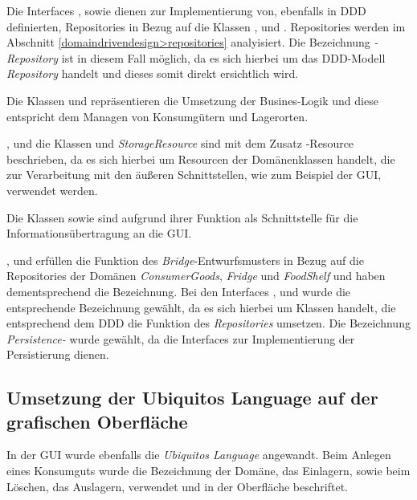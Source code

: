 Die Interfaces \href{}{}, \href{}{} sowie \href{}{} dienen zur Implementierung von, ebenfalls in \ac{DDD} definierten, Repositories in Bezug auf die Klassen \href{}{}, \href{}{} und \href{}{}.
Repositories werden im Abschnitt \ref{domaindrivendesign>repositories} analyisiert.
Die Bezeichnung \textit{-Repository} ist in diesem Fall möglich, da es sich hierbei um das \ac{DDD}-Modell \textit{Repository} handelt und dieses somit direkt ersichtlich wird.

Die Klassen \href{}{} und \href{}{} repräsentieren die Umsetzung der Busines-Logik und diese entspricht dem Managen von Konsumgütern und Lagerorten. 

\href{}{}, \href{}{} und die Klassen \href{}{} und \textit{StorageResource} sind mit dem Zusatz -Resource beschrieben, da es sich hierbei um Resourcen der Domänenklassen handelt, die zur Verarbeitung mit den äußeren Schnittstellen, wie zum Beispiel der \ac{GUI}, verwendet werden.

Die Klassen \href{}{} sowie \href{}{} sind aufgrund ihrer Funktion als Schnittstelle für die Informationsübertragung an die GUI.

\href{}{}, \href{}{} und \href{}{} erfüllen die Funktion des \textit{Bridge}-Entwurfsmusters in Bezug auf die Repositories der Domänen \textit{ConsumerGoods}, \textit{Fridge} und \textit{FoodShelf} und haben dementsprechend die Bezeichnung.
Bei den Interfaces \href{}{}, \href{}{} und \href{}{} wurde die entsprechende Bezeichnung gewählt, da es sich hierbei um Klassen handelt, die entsprechend dem \ac{DDD} die Funktion des \textit{Repositories} umsetzen.
Die Bezeichnung \textit{Persistence-} wurde gewählt, da die Interfaces zur Implementierung der Persistierung dienen.

\subsection*{Umsetzung der Ubiquitos Language auf der grafischen Oberfläche}
In der GUI wurde ebenfalls die \textit{Ubiquitos Language} angewandt.
Beim Anlegen eines Konsumguts wurde die Bezeichnung der Domäne, das Einlagern, sowie beim Löschen, das Auslagern, verwendet und in der Oberfläche beschriftet.

